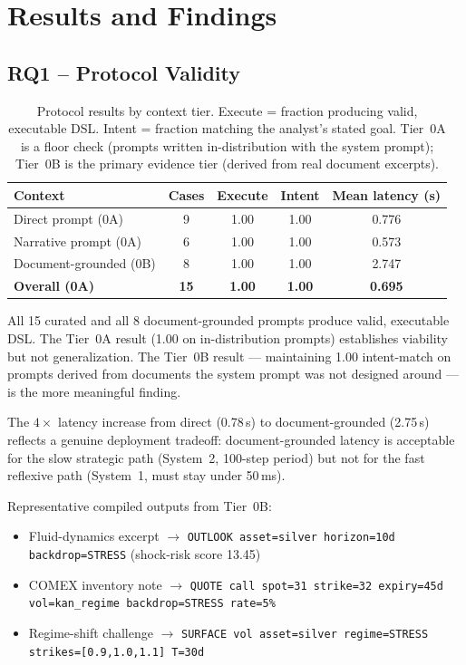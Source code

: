\documentclass[11pt,a4paper]{article}
\begin{document}
\section{Results and Findings}
\label{sec:results}

\subsection{RQ1 -- Protocol Validity}

\begin{table}[ht]
\centering
\caption{Protocol results by context tier. Execute = fraction producing valid,
executable DSL. Intent = fraction matching the analyst's stated goal. Tier~0A is a
floor check (prompts written in-distribution with the system prompt); Tier~0B is the
primary evidence tier (derived from real document excerpts).}
\begin{tabular}{@{}lcccc@{}}
\toprule
Context & Cases & Execute & Intent & Mean latency (s) \\ \midrule
Direct prompt (0A) & 9 & 1.00 & 1.00 & 0.776 \\
Narrative prompt (0A) & 6 & 1.00 & 1.00 & 0.573 \\
Document-grounded (0B) & 8 & 1.00 & 1.00 & 2.747 \\
\textbf{Overall (0A)} & \textbf{15} & \textbf{1.00} & \textbf{1.00} & \textbf{0.695} \\
\bottomrule
\end{tabular}
\label{tab:protocol}
\end{table}

All 15 curated and all 8 document-grounded prompts produce valid, executable DSL. The
Tier~0A result (1.00 on in-distribution prompts) establishes viability but not
generalization. The Tier~0B result --- maintaining 1.00 intent-match on prompts derived
from documents the system prompt was not designed around --- is the more meaningful
finding.

The $4\times$ latency increase from direct (0.78\,s) to document-grounded (2.75\,s)
reflects a genuine deployment tradeoff: document-grounded latency is acceptable for
the slow strategic path (System~2, 100-step period) but not for the fast reflexive
path (System~1, must stay under 50\,ms).

Representative compiled outputs from Tier~0B:
\begin{itemize}[nosep]
  \item Fluid-dynamics excerpt $\to$ \texttt{OUTLOOK asset=silver horizon=10d backdrop=STRESS} (shock-risk score 13.45)
  \item COMEX inventory note $\to$ \texttt{QUOTE call spot=31 strike=32 expiry=45d vol=kan\_regime backdrop=STRESS rate=5\%}
  \item Regime-shift challenge $\to$ \texttt{SURFACE vol asset=silver regime=STRESS strikes=[0.9,1.0,1.1] T=30d}
\end{itemize}
\end{document}
